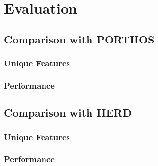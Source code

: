 \chapter{Evaluation}
\label{section:eval}

\section{Comparison with PORTHOS}

\subsection{Unique Features}
\subsection{Performance}




\section{Comparison with HERD}

\subsection{Unique Features}
\subsection{Performance}

